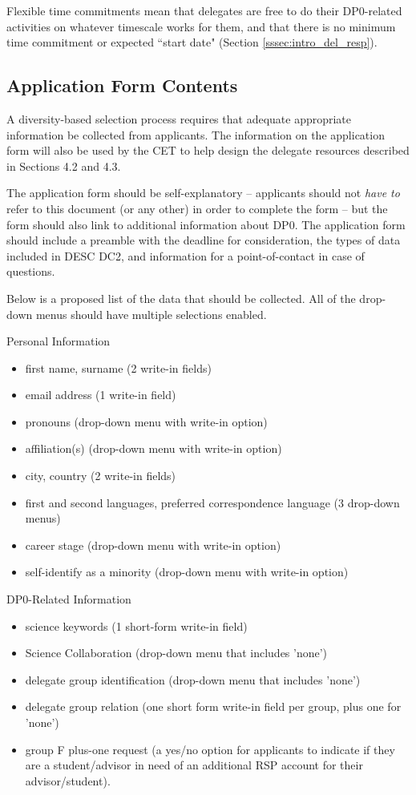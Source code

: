 \documentclass[DM,lsstdraft,authoryear,toc]{lsstdoc}
\begin{document}
Flexible time commitments mean that delegates are free to do their DP0-related activities on whatever timescale works for them, and that there is no minimum time commitment or expected ``start date" (Section \ref{sssec:intro_del_resp}).


\subsection{Application Form Contents}\label{ssec:sel_form}

A diversity-based selection process requires that adequate appropriate information be collected from applicants.
The information on the application form will also be used by the CET to help design the delegate resources described in Sections 4.2 and 4.3. 

The application form should be self-explanatory -- applicants should not \emph{have to} refer to this document (or any other) in order to complete the form -- but the form should also link to additional information about DP0.
The application form should include a preamble with the deadline for consideration, the types of data included in DESC DC2, and information for a point-of-contact in case of questions.

Below is a proposed list of the data that should be collected.
All of the drop-down menus should have multiple selections enabled.

Personal Information
\begin{itemize}
\item first name, surname (2 write-in fields)
\item email address (1 write-in field)
\item pronouns (drop-down menu with write-in option)
\item affiliation(s) (drop-down menu with write-in option)
\item city, country (2 write-in fields)
\item first and second languages, preferred correspondence language (3 drop-down menus)
\item career stage (drop-down menu with write-in option)
\item self-identify as a minority (drop-down menu with write-in option)
\end{itemize}

DP0-Related Information
\begin{itemize}
\item science keywords (1 short-form write-in field)
\item Science Collaboration (drop-down menu that includes 'none')
\item delegate group identification (drop-down menu that includes 'none')
\item delegate group relation (one short form write-in field per group, plus one for 'none')
\item group F plus-one request (a yes/no option for applicants to indicate if they are a student/advisor in need of an additional RSP account for their advisor/student).
\end{itemize}
\end{document}

